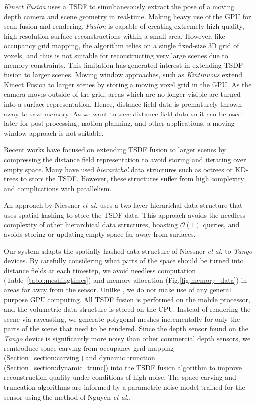 \documentclass[conference]{IEEEtran}
\newcommand{\sref}[1]{Section~\ref{#1}}
\newcommand{\figref}[1]{Fig.\ref{#1}}
\newcommand{\tabref}[1]{Table~\ref{#1}}
\newcommand{\etal}{\textit{et al.}\xspace}
\newcommand{\Tango}{\textit{Tango}\xspace}
\newcommand{\TSDF}{TSDF\xspace}
\begin{document}
\emph{Kinect Fusion} \cite{Newcombe} uses a \TSDF to simultanesously extract the
pose of a moving depth camera and scene geometry in real-time. Making
heavy use of the GPU for scan fusion and rendering, \textit{Fusion} is capable
of creating extremely high-quality, high-resolution surface reconstructions within
a small area. However, like occupancy grid mapping, the algorithm relies on a
single fixed-size 3D grid of voxels, and thus is not suitable for reconstructing
very large scenes due to memory constraints. This limitation has generated
interest in extending  \TSDF fusion to larger scenes. 
Moving window approaches, such as \emph{Kintinuous} \cite{Whelan2013} extend
Kinect Fusion to larger scenes by storing  a moving voxel grid in the GPU. As
the camera moves outside of the grid, areas which are no longer visible are
turned into a surface representation. Hence, distance field data is prematurely 
thrown away to save memory. As we want to save distance field data so it can be
used later for post-processing, motion planning, and other applications, a
moving window approach is not suitable.

Recent works have focused on extending \TSDF fusion to larger scenes by
compressing the distance field representation to avoid storing and iterating
over empty space. Many have used \textit{hierarichal} data structures such as
octrees or KD-trees to store the \TSDF \cite{Zeng2012, Chen2012}. However, these
structures suffer from high complexity and complications with parallelism. 

An approach by Niessner \etal \cite{NiessnerHashing} uses a two-layer
hierarichal data structure that uses spatial hashing \cite{SpatialHashing} to
store the \TSDF data. This approach avoids the needless complexity of other
hierarchical data structures, boasting $\mathcal{O}(1)$ queries, and avoids
storing or updating empty space far away from surfaces.

Our system adapts the spatially-hashed data structure of
Niessner \etal \cite{NiessnerHashing} to \Tango devices. By carefully
considering what parts of the space should be turned into distance fields at
each timestep, we avoid needless computation (\tabref{table:meshingtimes}) and
memory allocation (\figref{fig:memory_data}) in areas far away from the sensor.
Unlike \cite{NiessnerHashing}, we do not make use of any general purpose GPU
computing. All \TSDF fusion is performed on the mobile processor, and the
volumetric data structure is stored on the CPU. Instead of rendering the scene
via raycasting, we generate polygonal meshes incrementally for only the parts
of the scene that need to be rendered. Since the depth sensor found on the
\Tango device is significantly more noisy than other commercial depth
sensors, we reintroduce space carving \cite{Elfes1989} from occupancy grid
mapping (\sref{section:carving}) and dynamic trunction
(\sref{section:dynamic_trunc}) into the \TSDF fusion algorithm to improve
reconstruction quality under conditions of high noise. The space carving and
truncation algorithms are informed by a parametric noise model trained for the
sensor using the method of Nguyen \etal \cite{Nguyen2012}.
\end{document}
